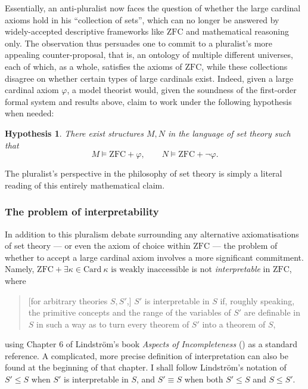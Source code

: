 \documentclass[12pt]{article}
\theoremstyle{plain}
\newtheorem*{hypothesis*}{Hypothesis}
\theoremstyle{definition}
\newcommand{\ZFC}{\mathrm{ZFC}}
\newcommand{\Card}{\mathrm{Card}}
\begin{document}
Essentially, an anti-pluralist now faces the question of whether the large cardinal axioms hold in his ``collection of sets'', which can no longer be answered by widely-accepted descriptive frameworks like $\ZFC$ and mathematical reasoning only. The observation thus persuades one to commit to a pluralist's more appealing counter-proposal, that is, an ontology of multiple different universes, each of which, as a whole, satisfies the axioms of $\ZFC$, while these collections disagree on whether certain types of large cardinals exist. Indeed, given a large cardinal axiom $\varphi$, a model theorist would, given the soundness of the first-order formal system and results above, claim to work under the following hypothesis when needed:

\begin{hypothesis*}
	There exist structures $M, N$ in the language of set theory such that
	\[M \vDash \ZFC + \varphi, \qquad N \vDash \ZFC + \neg \varphi.\]
\end{hypothesis*}

The pluralist's perspective in the philosophy of set theory is simply a literal reading of this entirely mathematical claim.

\subsubsection*{The problem of interpretability}

In addition to this pluralism debate surrounding any alternative axiomatisations of set theory --- or even the axiom of choice within $\ZFC$ --- the problem of whether to accept a large cardinal axiom involves a more significant commitment. Namely, $\ZFC + \exists \kappa \in \Card \ \text{$\kappa$ is weakly inaccessible}$ is not \emph{interpretable} in $\ZFC$, where

\begin{quote}
	[for arbitrary theories $S, S'$,] $S'$ is interpretable in $S$ if, roughly speaking, the primitive concepts and the range of the variables of $S'$ are definable in $S$ in such a way as to turn every theorem of $S'$ into a theorem of $S$,
\end{quote}

using Chapter 6 of Lindstr\"om's book \emph{Aspects of Incompleteness} (\cite{lindstrom-incompleteness}) as a standard reference. A complicated, more precise definition of interpretation can also be found at the beginning of that chapter. I shall follow Lindstr\"om's notation of $S' \leq S$ when $S'$ is interpretable in $S$, and $S' \equiv S$ when both $S' \leq S$ and $S \leq S'$.
\end{document}
